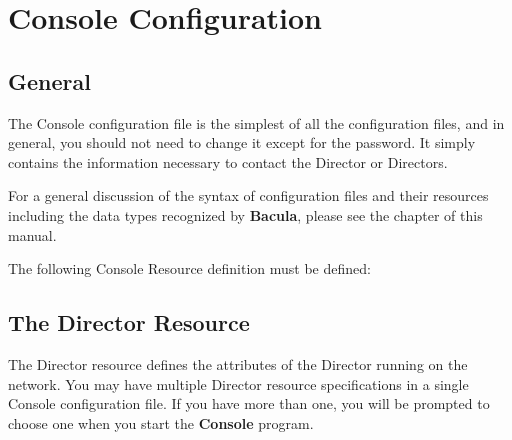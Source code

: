 
\chapter{Console Configuration}
\label{ConsoleConfChapter}

\section{General}

The Console configuration file is the simplest of all the configuration files,
and in general, you should not need to change it except for the password. It
simply contains the information necessary to contact the Director or
Directors. 

For a general discussion of the syntax of configuration files and their
resources including the data types recognized by {\bf Bacula}, please see
the  chapter of this manual.

The following Console Resource definition must be defined: 

\section{The Director Resource}
\label{DirectorResource3}

The Director resource defines the attributes of the Director running on the
network. You may have multiple Director resource specifications in a single
Console configuration file. If you have more than one, you will be prompted to
choose one when you start the {\bf Console} program. 

